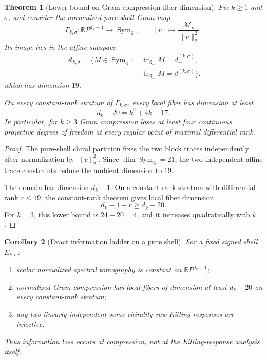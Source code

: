 \documentclass[
 aps,
 prd,
 reprint,
 amsmath,
 amssymb,
 nofootinbib,
 superscriptaddress
]{revtex4-2}
\newtheorem{theorem}{Theorem}[section]
\newtheorem{corollary}[theorem]{Corollary}
\theoremstyle{definition}
\theoremstyle{remark}
\newcommand{\cM}{\mathscr M}
\newcommand{\tr}{\operatorname{tr}}
\begin{document}
\begin{theorem}[Lower bound on Gram-compression fiber dimension]
\label{N:thm:gramfiber}
Fix \(k\ge1\) and \(\sigma\), and consider the normalized pure-shell Gram map
\[
 \Gamma_{k,\sigma}:
 \mathbb RP^{d_k-1}
 \longrightarrow
 \operatorname{Sym}_6,
 \qquad
 [v]\longmapsto
 \frac{\cM_v}{\|v\|_2^2}.
\]
Its image lies in the affine subspace
\begin{equation}
\begin{aligned}
 \mathcal A_{k,\sigma}
 =
 \bigl\{
 M\in\operatorname{Sym}_6:\;&
 \tr_{\mathfrak K_+}M=d_+^{(k,\sigma)},\\
 &
 \tr_{\mathfrak K_-}M=d_-^{(k,\sigma)}
 \bigr\}.
\end{aligned}
\label{N:eq:gramaffine}
\end{equation}
which has dimension \(19\).

On every constant-rank stratum of \(\Gamma_{k,\sigma}\), every local fiber
has dimension at least
\begin{equation}
 \boxed{
 d_k-20
 =
 k^2+4k-17.
 }
 \label{N:eq:fiberdim}
\end{equation}
In particular, for \(k\ge3\) Gram compression loses at least four continuous
projective degrees of freedom at every regular point of maximal differential
rank.
\end{theorem}

\begin{proof}
The pure-shell chiral partition fixes the two block traces independently
after normalization by \(\|v\|_2^2\).  Since
\(\dim\operatorname{Sym}_6=21\), the two independent affine trace
constraints reduce the ambient dimension to \(19\).

The domain has dimension \(d_k-1\).  On a constant-rank stratum with
differential rank \(r\le19\), the constant-rank theorem gives local fiber
dimension
\[
       d_k-1-r
       \ge
       d_k-20.
\]
For \(k=3\), this lower bound is \(24-20=4\), and it increases quadratically
with \(k\).
\end{proof}

\begin{corollary}[Exact information ladder on a pure shell]
\label{N:cor:informationladder}
For a fixed signed shell \(E_{k,\sigma}\):

\begin{enumerate}[label=(\roman*)]
\item scalar normalized spectral tomography is constant on
\(\mathbb RP^{d_k-1}\);

\item normalized Gram compression has local fibers of dimension at least
\(d_k-20\) on every constant-rank stratum;

\item any two linearly independent same-chirality raw Killing responses are
injective.

\end{enumerate}
Thus information loss occurs at compression, not at the Killing-response
analysis itself.
\end{corollary}
\end{document}
